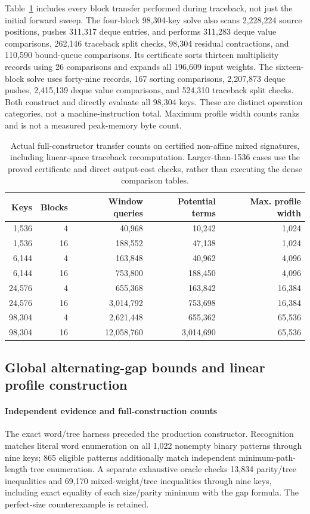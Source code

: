 \documentclass[11pt]{article}
\begin{document}
Table~\ref{tab:run-counts} includes every block transfer performed during
traceback, not just the initial forward sweep. The four-block 98,304-key
solve also scans 2,228,224 source positions, pushes 311,317 deque entries,
and performs 311,283 deque value comparisons, 262,146 traceback split
checks, 98,304 residual contractions, and 110,590 bound-queue comparisons.
Its certificate sorts thirteen multiplicity records using 26 comparisons
and expands all 196,609 input weights. The sixteen-block solve uses
forty-nine records, 167 sorting comparisons, 2,207,873 deque pushes,
2,415,139 deque value comparisons, and 524,310 traceback split checks.
Both construct and directly evaluate all 98,304 keys. These are distinct
operation categories, not a machine-instruction total. Maximum profile
width counts ranks and is not a measured peak-memory byte count.

\begin{table}[htbp]
\centering\small
\begin{tabular}{rrrrr}
\toprule
Keys & Blocks & Window queries & Potential terms & Max. profile width \\
\midrule
1,536 & 4 & 40,968 & 10,242 & 1,024 \\
1,536 & 16 & 188,552 & 47,138 & 1,024 \\
6,144 & 4 & 163,848 & 40,962 & 4,096 \\
6,144 & 16 & 753,800 & 188,450 & 4,096 \\
24,576 & 4 & 655,368 & 163,842 & 16,384 \\
24,576 & 16 & 3,014,792 & 753,698 & 16,384 \\
98,304 & 4 & 2,621,448 & 655,362 & 65,536 \\
98,304 & 16 & 12,058,760 & 3,014,690 & 65,536 \\
\bottomrule
\end{tabular}
\caption{Actual full-constructor transfer counts on certified non-affine
mixed signatures, including linear-space traceback recomputation.
Larger-than-1536 cases use the proved certificate and direct output-cost
checks, rather than executing the dense comparison tables.}
\label{tab:run-counts}
\end{table}


\subsection{Global alternating-gap bounds and linear profile construction}
\paragraph{Independent evidence and full-construction counts}\label{sec:legacy-24-4}
The exact word/tree harness preceded the production constructor. Recognition
matches literal word enumeration on all 1,022 nonempty binary patterns
through nine keys; 865 eligible patterns additionally match independent
minimum-path-length tree enumeration. A separate exhaustive oracle checks
13,834 parity/tree inequalities and 69,170 mixed-weight/tree inequalities
through nine keys, including exact equality of each size/parity minimum
with the gap formula. The perfect-size counterexample is retained.
\end{document}
